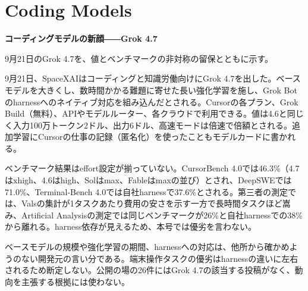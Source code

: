 \section{Coding Models}
\begin{wideflow}
{\Large\bfseries コーディングモデルの新顔――Grok 4.7}\par
\smallskip
{\color{SurveyMuted}9月21日のGrok 4.7を、値とベンチマークの非対称の留保とともに示す。}\par
\end{wideflow}

9月21日、SpaceXAIはコーディングと知識労働向けにGrok 4.7を出した\cite{grok47}。ベースモデルを大きくし、数時間かかる難題に寄せた長い強化学習を施し、Grok Botのharnessへのネイティブ対応を組み込んだとされる。Cursorの各プラン、Grok Build（無料）、APIやモデルルーター、各クラウドで利用できる。値は4.6と同じく入力100万トークン2ドル、出力6ドル、高速モードは倍速で倍額とされる。追加学習にCursorの仕事の記録（匿名化）を使ったこともモデルカードに書かれる。

ベンチマーク結果はeffort設定が揃っていない。CursorBench 4.0では46.3\%（4.7はxhigh、4.6はhigh、Solはmax、Fableはmaxの並び）とされ、DeepSWEでは71.0\%、Terminal-Bench 4.0では自社harnessで37.6\%とされる。第三者の測定では、Valsの集計が1タスクあたり費用の安さを示す一方で長時間タスクほど嵩み、Artificial Analysisの測定では同じベンチマークが26\%と自社harnessでの38\%から離れる\cite{datacampgrok47}。harness依存が見えるため、本号では優劣を言わない。

\begin{claimboundary}[資料と評価の境界]
ベースモデルの規模や強化学習の期間、harnessへの対応は、他所から確かめようのない開発元の言い分である。端末操作タスクの優劣はharnessの違いに左右されるため断定しない。公開の場の26件にはGrok 4.7の該当する投稿がなく、動向を主張する根拠には使わない。
\end{claimboundary}
